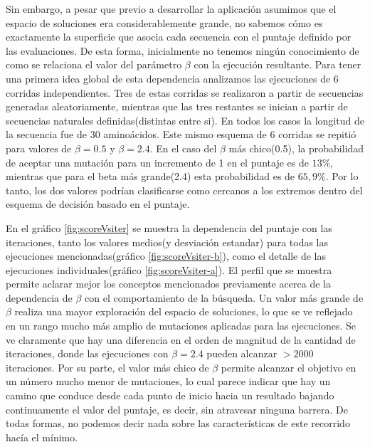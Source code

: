 

Sin embargo, a pesar que previo a desarrollar la aplicación asumimos que el espacio de soluciones era considerablemente grande, no sabemos cómo es exactamente 
la superficie que asocia cada secuencia con el puntaje definido por las evaluaciones. 
De esta forma, inicialmente no tenemos ningún conocimiento de como se relaciona el valor del parámetro $\beta$ con la ejecución resultante.
Para tener una primera idea global de esta dependencia analizamos las ejecuciones de 6 corridas independientes.
Tres de estas corridas se realizaron a partir de secuencias generadas aleatoriamente, mientras que las tres restantes se inician a partir de secuencias naturales definidas(distintas entre si).
En todos los casos la longitud de la secuencia fue de 30 aminoácidos.
Este mismo esquema de 6 corridas se repitió para valores de $\beta=0.5$ y $\beta=2.4$.
En el caso del $\beta$ más chico(0.5), la probabilidad de aceptar una mutación para un incremento de 1 en el puntaje es de $13\%$, mientras que para el beta más grande(2.4) esta probabilidad es de $65,9\%$.
Por lo tanto, los dos valores podrían clasificarse como cercanos a los extremos dentro del esquema de decisión basado en el puntaje.


En el gráfico \ref{fig:scoreVsiter} se muestra la dependencia del puntaje con las iteraciones, tanto los valores medios(y desviación estandar) para todas las ejecuciones mencionadas(gráfico \ref{fig:scoreVsiter-b}), 
como el detalle de las ejecuciones individuales(gráfico \ref{fig:scoreVsiter-a}).
El perfil que se muestra permite aclarar mejor los conceptos mencionados previamente acerca de la dependencia de $\beta$ con el comportamiento de la búsqueda. 
Un valor más grande de $\beta$ realiza una mayor exploración del espacio de soluciones, lo que se ve reflejado en un rango mucho más amplio de mutaciones aplicadas para las ejecuciones.
Se ve claramente que hay una diferencia en el orden de magnitud de la cantidad de iteraciones, donde las ejecuciones con $\beta=2.4$ pueden alcanzar $>2000$ iteraciones.
Por su parte, el valor más chico de $\beta$ permite alcanzar el objetivo en un número mucho menor de mutaciones, lo cual parece indicar que hay un camino 
que conduce desde cada punto de inicio hacia un resultado bajando continuamente el valor del puntaje, es decir, sin atravesar ninguna barrera.
De todas formas, no podemos decir nada sobre las características de este recorrido hacía el mínimo.


